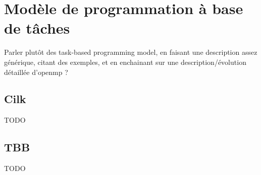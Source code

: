 \section{Modèle de programmation à base de tâches}\label{sec:context:others}

Parler plutôt des task-based programming model, en faisant une description assez générique, citant des exemples, et en enchainant sur une description/évolution détaillée d'openmp ?

\subsection{Cilk}

TODO

\subsection{TBB}

TODO

